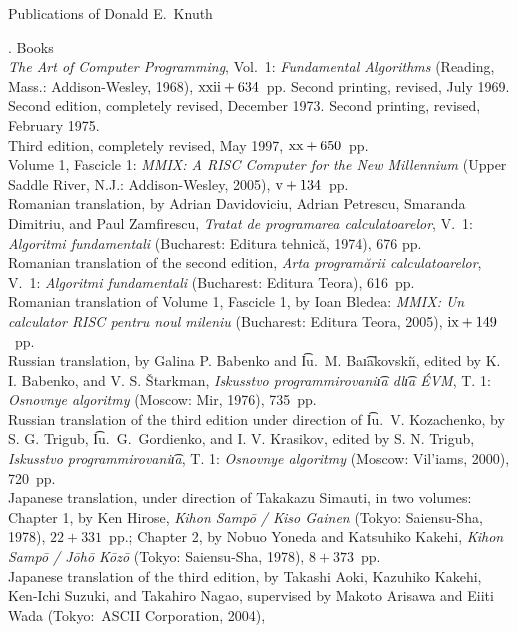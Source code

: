\centerline{\twelvess Publications of Donald E.\ Knuth}
\vskip 10pt
. {Books}
\\{\sl The Art of Computer Programming}, Vol.\ 1: {\sl Fundamental Algorithms}
 (Reading, Mass.: Addison-Wesley, 1968), $\rm xxii + 634$~pp. Second printing,
 revised, July 1969.
\\Second edition, completely revised, December 1973. Second printing, revised,
 February 1975.
\\Third edition, completely revised, May 1997, $\rm xx+650$~pp.
\\Volume 1, Fascicle 1: {\sl {\sltt MMIX:} A RISC Computer for the New
 Millennium\/} (Upper Saddle River, N.J.: Addison-Wesley, 2005),
 $\rm v+134$~pp.
\\Romanian translation, by Adrian Davidoviciu, Adrian Petrescu,
 Smaranda Dimitriu, and Paul Zamfirescu,
{\sl Tratat de programarea calculatoarelor}, V.~1: {\sl Algoritmi fundamentali}
 (Bucharest: Editura tehnic\u a, 1974), 676 pp.
\\Romanian translation of the second edition,
 {\sl Arta program\u{a}rii calculatoarelor\/}, V.~1:
 {\sl Algoritmi fundamentali\/} (Bucharest: Editura Teora),
 616~pp.
\\Romanian translation of Volume 1, Fascicle 1, by Ioan Bledea:
 {\sl {\sltt MMIX:} Un  calculator RISC pentru noul mileniu\/}
 (Bucharest: Editura Teora, 2005), $\rm ix+149$~pp. 
\\Russian translation, by Galina P. Babenko and \t Iu.~M. Ba\t \i akovski\u\i,
 edited by K. I. Babenko, and V. S. \v Starkman, {\sl Iskusstvo
 programmirovani\t \i a dl\t \i a \'EVM}, 
 T. 1: {\sl Osnovnye algoritmy\/} (Moscow: Mir, 1976), 735~pp.
\\Russian translation of the third edition under direction of
 \t Iu.~V. Kozachenko, by S. G. Trigub, \t Iu.~G.~Gor\-dienko,
 and I. V. Krasikov, edited by S. N. Trigub,
 {\sl Iskusstvo programmirovani\t \i a}, 
 T. 1: {\sl Osnovnye algo\-ritmy\/} (Moscow: Vil'iams, 2000), 720~pp.
\\Japanese translation, under direction of Takakazu Simauti, in two volumes: 
 Chapter 1, by Ken Hirose, {\sl Kihon Samp\=o / Kiso Gainen}
 (Tokyo: Saiensu-Sha, 1978), $22 + 331$~pp.;
 Chapter 2, by Nobuo Yoneda and Katsuhiko Kakehi,
  {\sl Kihon Samp\=o / J\=oh\=o K\=oz\=o}
 (Tokyo: Saiensu-Sha, 1978), $8 + 373$~pp.
\\Japanese translation of the third edition, by
 Takashi Aoki, Kazuhiko Kakehi, Ken-Ichi Suzuki, and Takahiro Nagao, supervised
 by Makoto Arisawa and Eiiti Wada (Tokyo:\ ASCII Corporation, 2004), 

